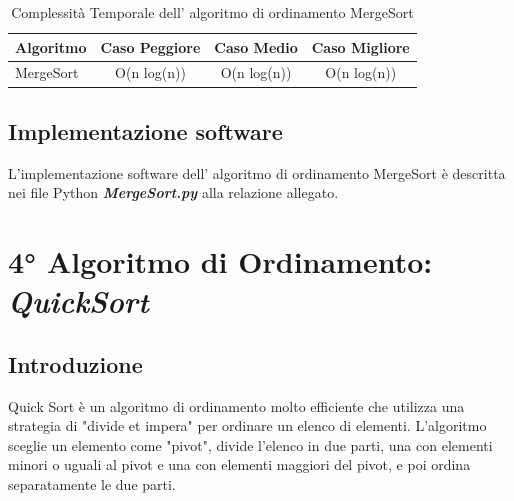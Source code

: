 \documentclass{article}
\begin{document}
			\begin{table}[ht]
				\centering
				\begin{tabular}{|l|ccc|}
					\rowcolor[HTML]{C0C0C0}
					\hline
					Algoritmo    		& Caso Peggiore & Caso Medio & Caso Migliore \\
					\hline
					MergeSort       	& O(n log(n))          & O(n log(n))    & O(n log(n))          \\
					\hline
				\end{tabular}
				\caption{Complessità Temporale dell' algoritmo di ordinamento MergeSort}
			\end{table}
	
		\subsection{Implementazione software}
			L'implementazione software dell' algoritmo di ordinamento MergeSort è descritta nei file Python \textbf{\textit{MergeSort.py}} alla relazione allegato.
	
	\newpage
	\section{4° Algoritmo di Ordinamento: \textit{QuickSort}}
		\subsection{Introduzione}
			Quick Sort è un algoritmo di ordinamento molto efficiente che utilizza una strategia di "divide et impera" per ordinare un elenco di elementi. L'algoritmo sceglie un elemento come "pivot", divide l'elenco in due parti, una con elementi minori o uguali al pivot e una con elementi maggiori del pivot, e poi ordina separatamente le due parti.
			
\end{document}
